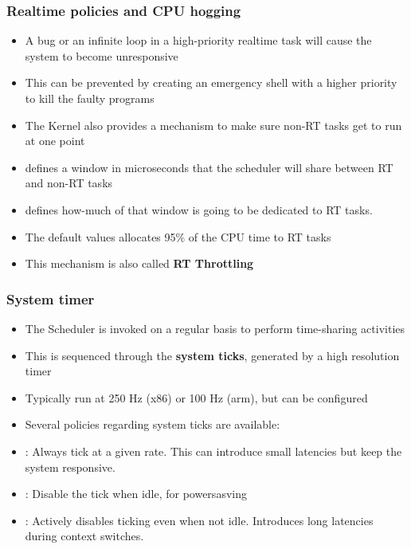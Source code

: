 

\begin{frame}
	\frametitle{Realtime policies and CPU hogging}
	\begin{itemize}
		\item A bug or an infinite loop in a high-priority realtime task will cause the system to become unresponsive
		\item This can be prevented by creating an emergency shell with a higher priority to kill the faulty programs
		\item The Kernel also provides a mechanism to make sure non-RT tasks get to run at one point
		\item {} defines a window in microseconds that the scheduler will share between RT and non-RT tasks
		\item {} defines how-much of that window is going to be dedicated to RT tasks.
		\item The default values allocates 95\% of the CPU time to RT tasks
		\item This mechanism is also called \textbf{RT Throttling}
	\end{itemize}
\end{frame}

\begin{frame}
	\frametitle{System timer}
	\begin{itemize}
		\item The Scheduler is invoked on a regular basis to perform time-sharing activities
		\item This is sequenced through the \textbf{system ticks}, generated by a high resolution timer
		\item Typically run at 250 Hz (x86) or 100 Hz (arm), but can be configured
		\item Several policies regarding system ticks are available:
		\item {}: Always tick at a given rate. This can introduce small latencies but keep the system responsive.
		\item {}: Disable the tick when idle, for powersasving
		\item {}: Actively disables ticking even when not idle. Introduces long latencies during context switches.
	\end{itemize}
\end{frame}

